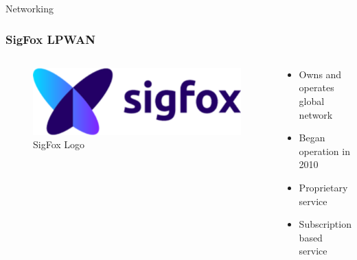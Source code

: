 \documentclass{beamer}
\begin{document}
  \begin{frame}{Networking}
    \frametitle{SigFox LPWAN}
    \begin{columns}
      \begin{column}{0.5\textwidth}
        \begin{figure}[htbp]
          \centering
          \includegraphics[width=\textwidth]{sigfox_logo.png}
          \caption{SigFox Logo}
          \label{fig:SigFox_logo}
        \end{figure}
      \end{column}
      \begin{column}{0.5\textwidth}
        \begin{itemize}
          \item Owns and operates global network
          \item Began operation in 2010
          \item Proprietary service
          \item Subscription based service
        \end{itemize}
      \end{column}
    \end{columns}
  \end{frame}
\end{document}
